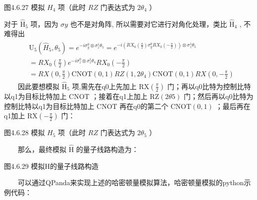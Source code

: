 \documentclass[a4paper,11pt,english]{sphinxmanual}
\begin{document}

\begin{center}图4.6.27 模拟 \(H_4\) 项（此时 \(RZ\) 门表达式为 \(2\theta_{4}\) ）
\end{center}
\sphinxAtStartPar
对于 \(\mathrm{\hat{H}}_5\) 项，因为  \(\sigma{y}\) 也不是对角阵, 所以需要对它进行对角化处理，类比  \(\mathrm{\hat{H}}_4\) , 不难得出
\begin{equation*}
\begin{split}\begin{aligned} &\mathrm{U}_{5}\left(\hat{H}_{5}, \theta_{5}\right)=e^{-i \sigma_{y}^{0} \otimes \sigma_{z}^{1} \theta_{5}}=e^{-i\left(R X_{0}\left(\frac{\pi}{2}\right) \sigma_{g}^{0} R X_{0}\left(-\frac{\pi}{2}\right)\right) \otimes \sigma_{z}^{1} \theta_{5}} \\ & =R X_{0}\left(\frac{\pi}{2}\right) e^{-i \sigma_{z}^{0} \otimes \sigma_{z}^{1} \theta_{4}} R X_{0}\left(-\frac{\pi}{2}\right) \\ &=R X\left(0, \frac{\pi}{2}\right) \text{CNOT}(0,1) R Z\left(1,2 \theta_{4}\right) \text{CNOT}(0,1) R X\left(0,-\frac{\pi}{2}\right) \end{aligned}\end{split}
\end{equation*}
\sphinxAtStartPar
  因此要想模拟 \(\mathrm{\hat{H}}_5\) 项,需先在q0上先加上 \(\text{RX}\left(\frac{\pi}{2}\right)\) 门；再以q0比特为控制比特以q1为目标比特加上 \(\mathrm{CNOT}\) ；接着在q1上加上 \(\mathrm{RZ}(2 \theta{5})\) 门；然后再以q0比特为控制比特以q1为目标比特加上 \(\mathrm{CNOT}\) 再在q0的第二个 \(\mathrm{CNOT(0,1)}\) ；最后再在q1加上 \(\text{RX}\left(-\frac{\pi}{2}\right)\) 门：


\begin{center}图4.6.28 模拟 \(H_5\) 项（此时 \(RZ\) 门表达式为 \(2\theta_{5}\) ）
\end{center}
\sphinxAtStartPar
  那么，最终模拟 \(\mathrm{\hat{H}}\) 的量子线路构造为：


\begin{center}图4.6.29 模拟H的量子线路构造
\end{center}
\sphinxAtStartPar
  可以通过QPanda来实现上述的哈密顿量模拟算法，哈密顿量模拟的python示例代码：
\end{document}
